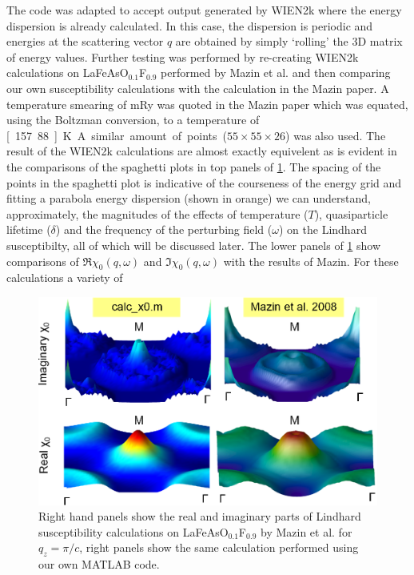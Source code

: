 The code was adapted to accept output generated by WIEN2k where the energy dispersion is already calculated. In this case, the dispersion is periodic and energies at the scattering vector $q$ are obtained by simply `rolling' the 3D matrix of energy values. Further testing was performed by re-creating WIEN2k calculations on LaFeAsO$_{0.1}$F$_{0.9}$ performed by Mazin et al.\cite{Mazin2008} and then comparing our own susceptibility calculations with the calculation in the Mazin paper. A temperature smearing of \unit[1]{mRy} was quoted in the Mazin paper which was equated, using the Boltzman conversion, to a temperature of \unit[157.88]{K}. A similar amount of points ($55\times55\times26$) was also used. The result of the WIEN2k calculations are almost exactly equivelent as is evident in the comparisons of the spaghetti plots in top panels of \fig\ref{Fig:3:MazinX0Comparison}. The spacing of the points in the spaghetti plot is indicative of the courseness of the energy grid and fitting a parabola energy dispersion (shown in orange) we can understand, approximately, the magnitudes of the effects of temperature ($T$), quasiparticle lifetime ($\delta$) and the frequency of the perturbing field ($\omega$) on the Lindhard susceptibilty, all of which will be discussed later. The lower panels of \fig\ref{Fig:3:MazinX0Comparison} show comparisons of $\Re\chi_0(q,\omega)$ and $\Im\chi_0(q,\omega)$ with the results of Mazin. For these calculations a variety of 

\begin{figure}[htbp]
    \begin{center}
        \includegraphics[scale=0.9]{Chapter3-dHvABaFe2P2/Figures/AngleDepMeasurements/SusceptibilityMazinComparison/SusceptibilityMazinComparison}
        \caption{Right hand panels show the real and imaginary parts of Lindhard susceptibility calculations on LaFeAsO$_{0.1}$F$_{0.9}$ by Mazin et al. for $q_z=\pi/c$, right panels show the same calculation performed using our own MATLAB code.}
        \label{Fig:3:MazinX0Comparison}
    \end{center}
\end{figure}

